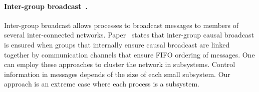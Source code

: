 \paragraph{Inter-group
  broadcast~\cite{johnson1998scalable,johnson1999intergroup}.} Inter-group
broadcast allows processes to broadcast messages to members of several
inter-connected networks. Paper~\cite{johnson1999intergroup} states that
inter-group causal broadcast is ensured when groups that internally ensure
causal broadcast are linked together by communication channels that ensure FIFO
ordering of messages. One can employ these approaches to cluster the network in
subsystems. Control information in messages depends of the size of each small
subsystem. Our approach is an extreme case where each process is a
subsystem.




